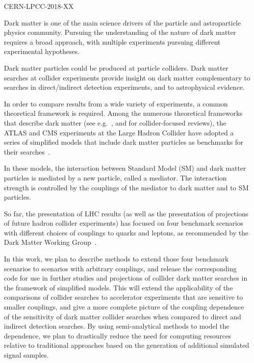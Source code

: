 \documentclass[a4paper, 11pt,notoc]{article}
\begin{document}
\author[14]{Andreas Albert,}


\hfill CERN-LPCC-2018-XX


\maketitle



\vskip10pt

Dark matter is one of the main science drivers of the particle and astroparticle physics community. Pursuing the understanding of the nature of dark matter requires a broad approach, with multiple experiments pursuing different experimental hypotheses.

Dark matter particles could be produced at particle colliders. Dark matter searches at collider experiments provide insight on dark matter complementary to searches in direct/indirect detection experiments, and to astrophysical evidence.

In order to compare results from a wide variety of experiments, a common theoretical framework is required. Among the numerous theoretical frameworks that describe dark matter (see e.g.~\cite{doi:10.1146/annurev-nucl-101917-021008}, and \cite{Kahlhoefer:2017dnp,doi:10.1146/annurev-astro-082708-101659} for collider-focused reviews), the ATLAS and CMS experiments at the Large Hadron Collider have adopted a series of simplified models that include dark matter particles as benchmarks for their searches~\cite{ABERCROMBIE2020100371}.

In these models, the interaction between Standard Model (SM) and dark matter particles is mediated by a new particle, called a mediator. The interaction strength is controlled by the couplings of the mediator to dark matter and to SM particles. 

So far, the presentation of LHC results (as well as the presentation of projections of future hadron collider experiments) has focused on four benchmark scenarios with different choices of couplings to quarks and leptons, as recommended by the Dark Matter Working Group~\cite{BOVEIA2020100365, ALBERT2019100377}.

In this work, we plan to describe methods to extend those four benchmark scenarios to scenarios with arbitrary couplings, and release the corresponding code for use in further studies and projections of collider dark matter searches in the framework of simplified models. This will extend the applicability of the comparisons of collider searches to accelerator experiments that are sensitive to smaller couplings, and give a more complete picture of the coupling dependence of the sensitivity of dark matter collider searches when compared to direct and indirect detection searches. By using semi-analytical methods to model the dependence, we plan to drastically reduce the need for computing resources relative to traditional approaches based on the generation of additional simulated signal samples.
\end{document}
